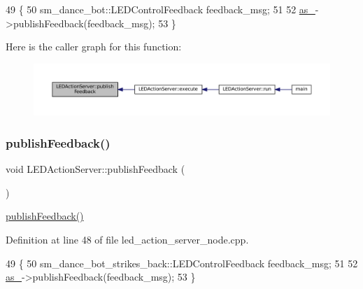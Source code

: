 \begin{DoxyCode}
49 \{
50     sm\_dance\_bot::LEDControlFeedback feedback\_msg;
51     
52     \hyperlink{classLEDActionServer_a61d21c77642081acf017d4ebd65b2de0}{as\_}->publishFeedback(feedback\_msg);
53 \}
\end{DoxyCode}
Here is the caller graph for this function\+:
\nopagebreak
\begin{figure}[H]
\begin{center}
\leavevmode
\includegraphics[width=350pt]{classLEDActionServer_a25c93d4e7ecdacbb4f5b090d7789aa36_icgraph}
\end{center}
\end{figure}
\mbox{\label{classLEDActionServer_a25c93d4e7ecdacbb4f5b090d7789aa36}} 
\subsubsection{\texorpdfstring{publish\+Feedback()}{publishFeedback()}\hspace{0.1cm}{\footnotesize\ttfamily [3/4]}}
{\footnotesize\ttfamily void L\+E\+D\+Action\+Server\+::publish\+Feedback (\begin{DoxyParamCaption}{ }\end{DoxyParamCaption})\hspace{0.3cm}{\ttfamily [inline]}}

\hyperlink{classLEDActionServer_a25c93d4e7ecdacbb4f5b090d7789aa36}{publish\+Feedback()} 

Definition at line 48 of file led\+\_\+action\+\_\+server\+\_\+node.\+cpp.


\begin{DoxyCode}
49 \{
50     sm\_dance\_bot\_strikes\_back::LEDControlFeedback feedback\_msg;
51     
52     \hyperlink{classLEDActionServer_a61d21c77642081acf017d4ebd65b2de0}{as\_}->publishFeedback(feedback\_msg);
53 \}
\end{DoxyCode}
\mbox{\label{classLEDActionServer_a25c93d4e7ecdacbb4f5b090d7789aa36}} 
